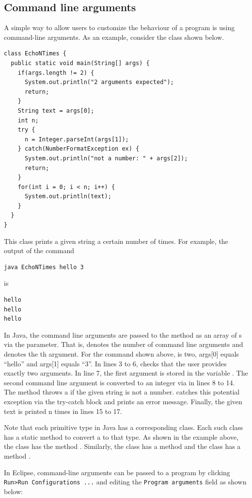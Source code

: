 \documentclass{book}
\begin{document}
\subsection{Command line arguments}
A simple way to allow users to customize the behaviour of a program is using command-line arguments. As an example, consider the class  shown below. 
\begin{lstlisting}
class EchoNTimes {
  public static void main(String[] args) {
    if(args.length != 2) {
      System.out.println("2 arguments expected");
      return;
    }
    String text = args[0];
    int n;
    try {
      n = Integer.parseInt(args[1]); 
    } catch(NumberFormatException ex) {
      System.out.println("not a number: " + args[2]);
      return;     
    }
    for(int i = 0; i < n; i++) {
      System.out.println(text);    
    }
  }
}
\end{lstlisting}
This class prints a given string a certain number of times. For example, the output of the command
\begin{verbatim}
java EchoNTimes hello 3
\end{verbatim}
is
\begin{verbatim}
hello
hello
hello
\end{verbatim}
In Java, the command line arguments are passed to the  method as an array of s via the  parameter. That is,  denotes the number of command line arguments and  denotes the th argument. For the command shown above,  is two, args[0] equals ``hello'' and args[1] equals ``3''. In lines 3 to 6,  checks that the user provides exactly two arguments. In line 7, the first argument is stored in the variable . The second command line argument is converted to an integer via  in lines 8 to 14. The method  throws a  if the given string is not a number.  catches this potential exception via the try-catch block and prints an error message. Finally, the given text is printed n times in lines 15 to 17.

Note that each primitive type in Java has a corresponding class. Each such class has a static method to convert a  to that type. As shown in the example above, the class  has the method . Similarly, the class  has a method  and the class  has a method .

In Eclipse, command-line arguments can be passed to a program by clicking \texttt{Run>Run Configurations ...} and editing the \texttt{Program arguments} field as shown below:
\end{document}
